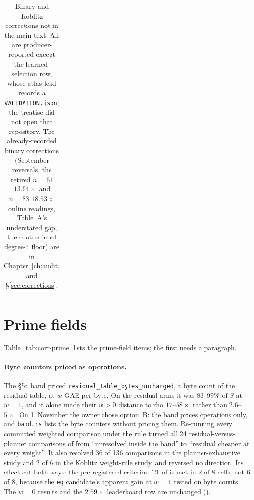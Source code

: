 \begin{table}[tbp]
\begin{tabularx}{\linewidth}{@{}>{\raggedright\arraybackslash}p{0.17\linewidth}>{\raggedright\arraybackslash}X>{\raggedright\arraybackslash}X>{\raggedright\arraybackslash}p{0.21\linewidth}@{}}
\bottomrule
\end{tabularx}
\caption[]{Binary and Koblitz corrections not in the main text. All are
producer-reported except the learned-selection row, whose atlas lead records
a \texttt{VALIDATION.json}; the treatise did not open that repository. The
already-recorded binary corrections (September reversals, the retired $n=61$
$13.94\times$ and $n=83$ $18.53\times$ online readings, Table~A's understated
gap, the contradicted degree-4 floor) are in Chapter~\ref{ch:audit} and
\S\ref{sec:corrections}.}
\label{tab:corr-binary}
\end{table}

\section{Prime fields}\label{sec:corr-prime}

Table~\ref{tab:corr-prime} lists the prime-field items; the first needs a
paragraph.

\paragraph{Byte counters priced as operations.} The \S5a band priced
\texttt{residual\_table\_\allowbreak bytes\_\allowbreak uncharged}, a byte count of the residual
table, at $w$ GAE per byte. On the residual arms it was $83$--$99\%$ of $S$ at
$w=1$, and it alone made their $w>0$ distance to rho $17$--$58\times$ rather
than $2.6$--$5\times$. On 1~November the owner chose option~B: the band prices
operations only, and \texttt{band.rs} lists the byte counters without pricing
them. Re-running every committed weighted comparison under the rule turned all
24 residual-versus-planner comparisons of 
from ``unresolved inside the band'' to ``residual cheaper at every weight''. It
also resolved 36 of 136 comparisons in the planner-exhaustive study and 2 of 6
in the Koblitz weight-rule study, and reversed no direction. Its effect cut both ways: the
pre-registered criterion C1 of  is met
in 2 of 8 cells, not 6 of 8, because the \texttt{eq} candidate's apparent gain
at $w=1$ rested on byte counts. The $w=0$ results and the $2.59\times$
leaderboard row are unchanged
().

